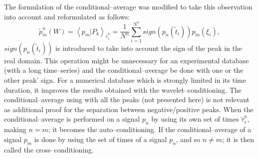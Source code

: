 The formulation of the conditional--average was modified to take this observation into account and reformulated as follows:
\begin{equation} \label{eqn:condAvgSign}
\tilde{p}_{m}^n\left( W \right) = \left< p_{m} | P_{k} \right>_{\tilde{\tau}^n_{s}} = \frac{1}{N^n} \sum^{N^n}_{i = 1} sign\left( p_{n} \left( \tilde{t}_{i} \right) \right) p_{m} \left( \xi_{i} \right),
\end{equation}
$sign\left( p_{n} \left( \tilde{t}_{i} \right) \right)$ is introduced to take into account the sign of the peak in the real domain. This operation might be unnecessary for an experimental database (with a long time--series) and the conditional--average be done with one or the other peak' sign.
For a numerical database which is strongly limited in its time duration, it improves the results obtained with the wavelet--conditioning.
The conditional--average using  with all the peaks (not presented here) is not relevant as additional proof for the separation between negative/positive peaks.
When the conditional--average is performed on a signal $p_{n}$ by using its own set of times ${\tilde{\tau}^n_{s}}$, making $n = m$; it becomes the auto--conditioning. If the conditional--average of a signal $p_{m}$ is done by using the set of times of a signal $p_{n}$, and so $n \neq m$; it is then called the cross--conditioning. 

